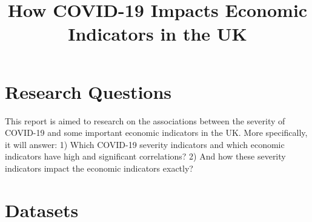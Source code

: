 \documentclass[12pt, a4paper]{report}
\title{How COVID-19 Impacts Economic Indicators in the UK}
\author{}
\date{}
\begin{document}
\maketitle

\section{Research Questions}
This report is aimed to research on the associations between the severity of COVID-19 and some important 
economic indicators in the UK. More specifically, it will answer:
1) Which COVID-19 severity indicators and which economic indicators have high and significant correlations?
2) And how these severity indicators impact the economic indicators exactly?


\section{Datasets}
\end{document}
